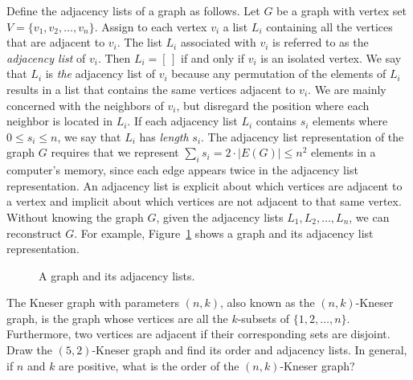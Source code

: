 Define the adjacency lists of a graph as
follows. Let $G$ be a graph with vertex set
$V = \{v_1, v_2, \dots, v_n\}$. Assign to each vertex $v_i$ a list
$L_i$ containing all the vertices that are adjacent to $v_i$. The list
$L_i$ associated with $v_i$ is referred to as the
\emph{adjacency list} of $v_i$. Then
$L_i = [\,]$ if and only if $v_i$ is an isolated
vertex. We say that $L_i$ is \emph{the}
adjacency list of $v_i$ because any permutation of the elements of
$L_i$ results in a list that contains the same vertices adjacent to
$v_i$. We are mainly concerned with the neighbors of $v_i$, but
disregard the position where each neighbor is located in $L_i$. If
each adjacency list $L_i$ contains $s_i$
elements where $0 \leq s_i \leq n$, we say that $L_i$ has
\emph{length} $s_i$. The adjacency list
representation of the graph $G$ requires that we represent
$\sum_i s_i = 2 \cdot |E(G)| \leq n^2$ elements in a computer's
memory, since each edge appears twice in the adjacency list
representation. An adjacency list is explicit
about which vertices are adjacent to a vertex and implicit about
which vertices are not adjacent to that same vertex. Without knowing
the graph $G$, given the adjacency lists $L_1, L_2, \dots, L_n$, we
can reconstruct $G$. For example,
Figure~\ref{fig:graph_algorithms:graph_adjacency_lists} shows a graph
and its adjacency list representation.

\begin{figure}[!htbp]
\centering
{}

\caption{A graph and its adjacency lists.}
\label{fig:graph_algorithms:graph_adjacency_lists}
\end{figure}

\begin{example}
The Kneser graph with parameters $(n,k)$, also
known as the $(n,k)$-Kneser graph, is the graph
whose vertices are all the $k$-subsets of $\{1, 2, \dots,
n\}$. Furthermore, two vertices are adjacent if their corresponding
sets are disjoint. Draw the $(5,2)$-Kneser graph
and find its order and adjacency lists. In
general, if $n$ and $k$ are positive, what is the order of the
$(n,k)$-Kneser graph?
\end{example}

